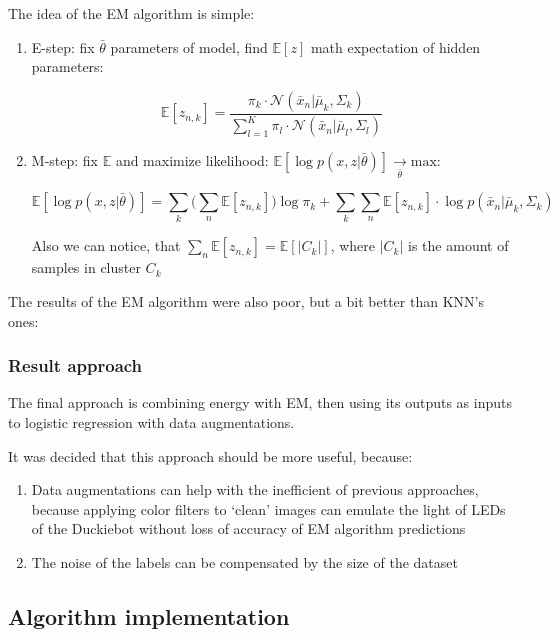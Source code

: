 The idea of the EM algorithm is simple:
\begin{enumerate}
    \item E-step: fix $\bar\theta$ \- parameters of model, find $\mathbb{E}[z]$ \- math expectation of hidden parameters:

    \[\mathbb{E}[z_{n, k}] = \displaystyle \frac{\pi_k\cdot \mathcal{N}(\bar x_n | \bar \mu_k, \Sigma_k)}{\sum\limits_{l=1}^K \pi_l \cdot \mathcal{N}(\bar x_n | \bar \mu_l, \Sigma_l)}\]
    \item M-step: fix $\mathbb{E}$ and maximize likelihood: $\mathbb{E}[\log p(x,z|\bar\theta)] \overset{}{\underset{\bar \theta}{\longrightarrow}} \text{max}$:

    \[\mathbb{E}[\log p(x,z|\bar\theta)] = \sum\limits_k\Big(\sum\limits_n\mathbb{E}[z_{n,k}]\Big) \log \pi_k + \sum\limits_k\sum\limits_n\mathbb{E}[z_{n,k}]\cdot \log p(\bar x_n|\bar\mu_k,\Sigma_k)\]

Also we can notice, that $\sum\limits_n\mathbb{E}[z_{n,k}] = \mathbb{E}[|C_k|]$, where $|C_k|$ is the amount of samples in cluster $C_k$
\end{enumerate}

The results of the EM algorithm were also poor, but a bit better than KNN's ones:

\subsubsection{Result approach}
The final approach is combining energy with EM, 
then using its outputs as inputs to logistic regression\cite{log_regression} with 
data augmentations\cite{augmentations}\cite{synthetic_data}. 

It was decided that this approach should be more useful, because:
\begin{enumerate}
    \item Data augmentations can help with the inefficient of previous approaches, 
    because applying color filters to `clean' images can emulate the light of LEDs 
    of the Duckiebot without loss of accuracy of EM algorithm predictions
    \item The noise of the labels can be compensated by the size of the 
    dataset\cite{big_data_less_noice}
\end{enumerate}

\subsection{Algorithm implementation}
